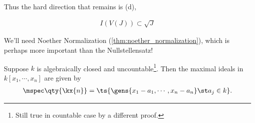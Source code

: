 Thus the hard direction that remains is (d),

\begin{align*}
I(V(J)) \subset \sqrt{J}
\end{align*}

\begin{warnings}

We'll need Noether Normalization (\cref{thm:noether_normalization}),
which is perhaps more important than the Nullstellensatz!

\end{warnings}

\begin{theorem}\label{thm:nullstellensatz_one}

Suppose \(k\) is algebraically closed and uncountable\footnote{Still
  true in countable case by a different proof.}. Then the maximal ideals
in \(k[x_1, \cdots, x_n]\) are given by
\begin{align*}  
\mspec\qty{\kx{n}} = \ts{ \gens{x_1 - a_1, \cdots, x_n - a_n} \st a_j\in k}
.\end{align*}

\end{theorem}

